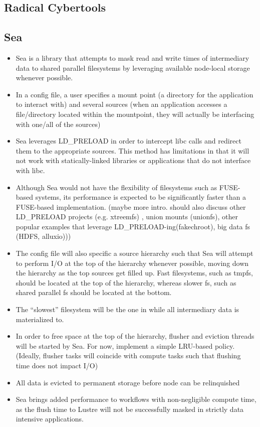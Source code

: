 \documentclass[conference]{IEEEtran}
\begin{document}
    \subsection{Radical Cybertools}
    \subsection{Sea}
        \begin{itemize}
                \item Sea is a library that attempts to mask read and write times of intermediary data to shared parallel
        filesystems by leveraging available node-local storage whenever possible.
                \item In a config file, a user specifies a mount point (a directory for the application to interact with) and several sources
        (when an application accesses a file/directory located within the mountpoint, they will actually be interfacing with one/all of the sources)
                \item Sea leverages LD\_PRELOAD in order to intercept libc calls and redirect them to the appropriate sources. This method has limitations in that
        it will not work with statically-linked libraries or applications that do not interface with libc.
                \item  Although Sea would not have the flexibility of filesystems such as FUSE-based systems, its performance is expected to be significantly faster than
    a FUSE-based implementation. (maybe more intro. should also discuss other LD\_PRELOAD projects (e.g. xtreemfs) , union mounts (unionfs), other popular examples that leverage LD\_PRELOAD-ing(fakechroot), big data fs (HDFS, alluxio)))
                \item  The config file will also specific a source hierarchy such that Sea will attempt to perform I/O at the top of the hierarchy whenever possible,
        moving down the hierarchy as the top sources get filled up. Fast filesystems, such as tmpfs, should be located at the top of the hierarchy, whereas slower
        fs, such as shared parallel fs should be located at the bottom. 
                \item The ``slowest'' filesystem will be the one in while all intermediary data is materialized to.
                \item In order to free space at the top of the hierarchy, flusher and eviction threads will be started by Sea. For now, implement a simple LRU-based policy. (Ideally, flusher tasks will coincide with compute tasks such that flushing time does not impact I/O)
                \item All data is evicted to permanent storage before node can be relinquished
                \item Sea brings added performance to workflows with non-negligible compute time, as the flush time to Lustre will not be successfully masked in strictly data intensive applications.
        \end{itemize}
\end{document}
